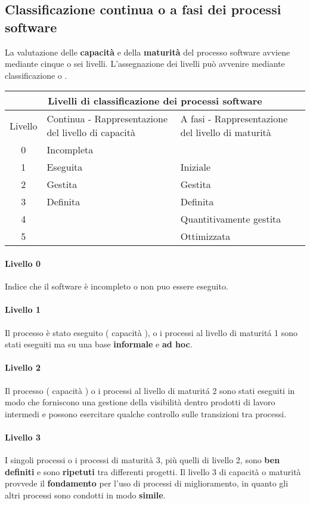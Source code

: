 \subsection{Classificazione continua o a fasi dei processi software}
La valutazione delle \textbf{capacit\`a} e della \textbf{maturit\`a} del processo software avviene mediante cinque o sei livelli. L'assegnazione dei livelli pu\`o avvenire mediante classificazione  o . \newline
\begin{center}
\caption{Tabella 8.1 dello SWEBok 8.3.4}
\begin{tabular}{|c|p{5cm}|p{5cm}|}
\hline
\multicolumn{3}{|c|}{Livelli di classificazione dei processi software} \\
\hline
Livello & Continua - Rappresentazione del livello di capacit\`a & A fasi - Rappresentazione del livello di maturit\`a \\ \hline
0 & Incompleta & \\ \hline
1 & Eseguita & Iniziale \\ \hline
2 & Gestita & Gestita \\ \hline
3 & Definita & Definita \\ \hline
4 & & Quantitivamente gestita \\ \hline
5 & & Ottimizzata \\
\hline
\end{tabular}
\end{center}
\paragraph{Livello 0}
Indice che il software \`e incompleto o non puo essere eseguito.
\paragraph{Livello 1}
Il processo \`e stato eseguito ( capacit\`a ), o i processi al livello di maturit\'a 1 sono stati eseguiti ma su una base \textbf{informale} e \textbf{ad hoc}.
\paragraph{Livello 2}
Il processo ( capacit\`a ) o i processi al livello di maturit\'a 2 sono stati eseguiti in modo che forniscono una gestione della visibilit\`a dentro prodotti di lavoro intermedi e possono esercitare qualche controllo sulle transizioni tra processi. 
\paragraph{Livello 3}
I singoli processi o i processi di maturit\`a 3, pi\`u quelli di livello 2, sono \textbf{ben definiti} e sono \textbf{ripetuti} tra differenti progetti. \newline
Il livello 3 di capacit\`a o maturit\`a provvede il \textbf{fondamento} per l'uso di processi di miglioramento, in quanto gli altri processi sono condotti in modo \textbf{simile}. \newline
